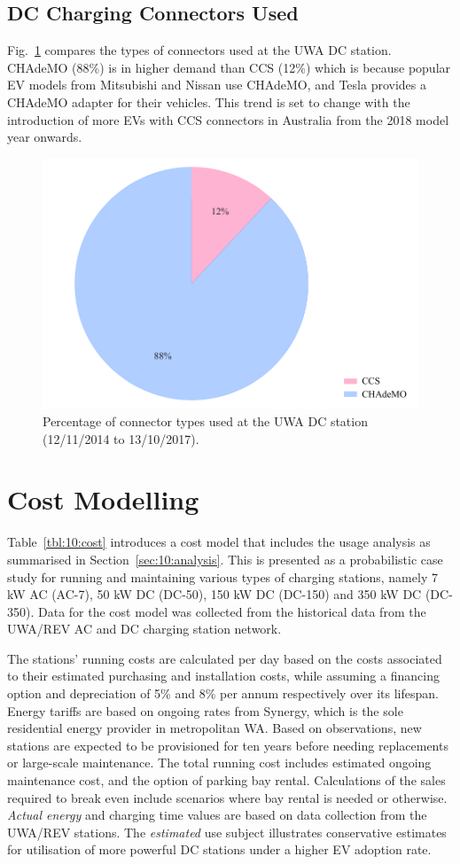 \subsection{DC Charging Connectors Used}
\label{sec:10:dcconn}
Fig.~\ref{fig:10:uwaplug} compares the types of connectors used at the UWA DC station. CHAdeMO (88\%) is in higher demand than CCS (12\%) which is because popular EV models from Mitsubishi and Nissan use CHAdeMO, and Tesla provides a CHAdeMO adapter for their vehicles. This trend is set to change with the introduction of more EVs with CCS connectors in Australia from the 2018 model year onwards. 

\begin{figure}[H]
	\centering
	\includegraphics[width=0.7\linewidth]{uwaplug}
	\caption[Percentage of connector types used at the UWA DC station]{Percentage of connector types used at the UWA DC station (12/11/2014 to 13/10/2017).}
	\label{fig:10:uwaplug}
\end{figure}

\section{Cost Modelling}
\label{sec:10:cost}
Table~\ref{tbl:10:cost} introduces a cost model that includes the usage analysis as summarised in Section~\ref{sec:10:analysis}. This is presented as a probabilistic case study for running and maintaining various types of charging stations, namely 7 kW AC (AC-7), 50 kW DC (DC-50), 150 kW DC (DC-150) and 350 kW DC (DC-350). Data for the cost model was collected from the historical data from the UWA/REV AC and DC charging station network.

The stations' running costs are calculated per day based on the costs associated to their estimated purchasing and installation costs, while assuming a financing option and depreciation of 5\% and 8\% per annum respectively over its lifespan. Energy tariffs are based on ongoing rates from Synergy, which is the sole residential energy provider in metropolitan WA. Based on observations, new stations are expected to be provisioned for ten years before needing replacements or large-scale maintenance. The total running cost includes estimated ongoing maintenance cost, and the option of parking bay rental. Calculations of the sales required to break even include scenarios where bay rental is needed or otherwise. \textit{Actual energy} and charging time values are based on data collection from the UWA/REV stations. The \textit{estimated} use subject illustrates conservative estimates for utilisation of more powerful DC stations under a higher EV adoption rate. 

